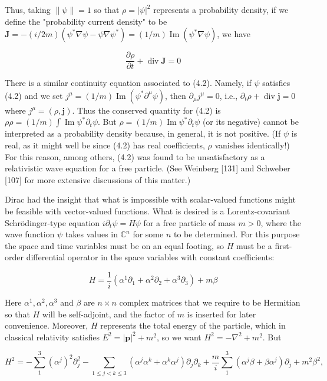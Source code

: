 \documentclass[10pt, letterpaper]{article}
\begin{document}
Thus, taking $\|\psi\|=1$ so that $\rho=|\psi|^{2}$ represents a probability density, if we define the "probability current density" to be $\mathbf{J}=-(i / 2 m)\left(\psi^{*} \nabla \psi-\psi \nabla \psi^{*}\right)= (1 / m) \operatorname{Im}\left(\psi^{*} \nabla \psi\right)$, we have

$$
\frac{\partial \rho}{\partial t}+\operatorname{div} \mathbf{J}=0
$$

There is a similar continuity equation associated to (4.2). Namely, if $\psi$ satisfies (4.2) and we set $j^{\mu}=(1 / m) \operatorname{Im}\left(\psi^{*} \partial^{\mu} \psi\right)$, then $\partial_{\mu} j^{\mu}=0$, i.e., $\partial_{t} \rho+\operatorname{div} \mathbf{j}=0$ where $j^{\mu}=(\rho, \mathbf{j})$. Thus the conserved quantity for (4.2) is $\rho \rho=(1 / m) \int \operatorname{Im} \psi^{*} \partial_{t} \psi$. But $\rho=(1 / m) \operatorname{Im} \psi^{*} \partial_{t} \psi$ (or its negative) cannot be interpreted as a probability density because, in general, it is not positive. (If $\psi$ is real, as it might well be since (4.2) has real coefficients, $\rho$ vanishes identically!) For this reason, among others, (4.2) was found to be unsatisfactory as a relativistic wave equation for a free particle. (See Weinberg [131] and Schweber [107] for more extensive discussions of this matter.)

Dirac had the insight that what is impossible with scalar-valued functions might be feasible with vector-valued functions. What is desired is a Lorentz-covariant Schrödinger-type equation $i \partial_{t} \psi=H \psi$ for a free particle of mass $m>0$, where the wave function $\psi$ takes values in $\mathbb{C}^{n}$ for some $n$ to be determined. For this purpose the space and time variables must be on an equal footing, so $H$ must be a first-order differential operator in the space variables with constant coefficients:

$$
H=\frac{1}{i}\left(\alpha^{1} \partial_{1}+\alpha^{2} \partial_{2}+\alpha^{3} \partial_{3}\right)+m \beta
$$

Here $\alpha^{1}, \alpha^{2}, \alpha^{3}$ and $\beta$ are $n \times n$ complex matrices that we require to be Hermitian so that $H$ will be self-adjoint, and the factor of $m$ is inserted for later convenience. Moreover, $H$ represents the total energy of the particle, which in classical relativity satisfies $E^{2}=|\mathbf{p}|^{2}+m^{2}$, so we want $H^{2}=-\nabla^{2}+m^{2}$. But

$$
H^{2}=-\sum_{1}^{3}\left(\alpha^{j}\right)^{2} \partial_{j}^{2}-\sum_{1 \leq j<k \leq 3}\left(\alpha^{j} \alpha^{k}+\alpha^{k} \alpha^{j}\right) \partial_{j} \partial_{k}+\frac{m}{i} \sum_{1}^{3}\left(\alpha^{j} \beta+\beta \alpha^{j}\right) \partial_{j}+m^{2} \beta^{2},
$$
\end{document}
